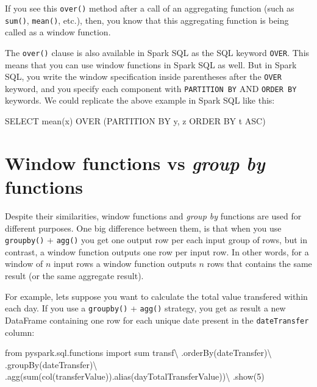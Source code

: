 \documentclass[
  11pt,
  letterpaper,
  DIV=11,
  numbers=noendperiod]{scrreprt}
\newenvironment{Shaded}{\begin{snugshade}}{\end{snugshade}}
\newcommand{\BuiltInTok}[1]{\textcolor[rgb]{0.00,0.23,0.31}{#1}}
\newcommand{\DecValTok}[1]{\textcolor[rgb]{0.68,0.00,0.00}{#1}}
\newcommand{\ImportTok}[1]{\textcolor[rgb]{0.00,0.46,0.62}{#1}}
\newcommand{\KeywordTok}[1]{\textcolor[rgb]{0.00,0.23,0.31}{#1}}
\newcommand{\NormalTok}[1]{\textcolor[rgb]{0.00,0.23,0.31}{#1}}
\newcommand{\OperatorTok}[1]{\textcolor[rgb]{0.37,0.37,0.37}{#1}}
\newcommand{\StringTok}[1]{\textcolor[rgb]{0.13,0.47,0.30}{#1}}
\begin{document}
If you see this \texttt{over()} method after a call of an aggregating
function (such as \texttt{sum()}, \texttt{mean()}, etc.), then, you know
that this aggregating function is being called as a window function.

The \texttt{over()} clause is also available in Spark SQL as the SQL
keyword \texttt{OVER}. This means that you can use window functions in
Spark SQL as well. But in Spark SQL, you write the window specification
inside parentheses after the \texttt{OVER} keyword, and you specify each
component with \texttt{PARTITION\ BY} AND \texttt{ORDER\ BY} keywords.
We could replicate the above example in Spark SQL like this:

\begin{Shaded}
\begin{Highlighting}[]
\KeywordTok{SELECT}\NormalTok{ mean(x) }\KeywordTok{OVER}\NormalTok{ (}\KeywordTok{PARTITION} \KeywordTok{BY}\NormalTok{ y, z }\KeywordTok{ORDER} \KeywordTok{BY}\NormalTok{ t }\KeywordTok{ASC}\NormalTok{)}
\end{Highlighting}
\end{Shaded}

\hypertarget{window-functions-vs-group-by-functions}{%
\section{\texorpdfstring{Window functions vs \emph{group by}
functions}{Window functions vs group by functions}}\label{window-functions-vs-group-by-functions}}

Despite their similarities, window functions and \emph{group by}
functions are used for different purposes. One big difference between
them, is that when you use \texttt{groupby()} + \texttt{agg()} you get
one output row per each input group of rows, but in contrast, a window
function outputs one row per input row. In other words, for a window of
\(n\) input rows a window function outputs \(n\) rows that contains the
same result (or the same aggregate result).

For example, lets suppose you want to calculate the total value
transfered within each day. If you use a \texttt{groupby()} +
\texttt{agg()} strategy, you get as result a new DataFrame containing
one row for each unique date present in the \texttt{dateTransfer}
column:

\begin{Shaded}
\begin{Highlighting}[]
\ImportTok{from}\NormalTok{ pyspark.sql.functions }\ImportTok{import} \BuiltInTok{sum}
\NormalTok{transf}\OperatorTok{\textbackslash{}}
\NormalTok{    .orderBy(}\StringTok{\textquotesingle{}dateTransfer\textquotesingle{}}\NormalTok{)}\OperatorTok{\textbackslash{}}
\NormalTok{    .groupBy(}\StringTok{\textquotesingle{}dateTransfer\textquotesingle{}}\NormalTok{)}\OperatorTok{\textbackslash{}}
\NormalTok{    .agg(}\BuiltInTok{sum}\NormalTok{(col(}\StringTok{\textquotesingle{}transferValue\textquotesingle{}}\NormalTok{)).alias(}\StringTok{\textquotesingle{}dayTotalTransferValue\textquotesingle{}}\NormalTok{))}\OperatorTok{\textbackslash{}}
\NormalTok{    .show(}\DecValTok{5}\NormalTok{)}
\end{Highlighting}
\end{Shaded}
\end{document}
